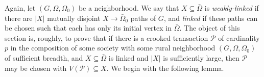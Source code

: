 Again, let $(G, \Omega, \Omega_0)$ be a neighborhood. We say that $X \subseteq \bar{\Omega}$ is \textit{weakly-linked} if there are $|X|$ mutually disjoint $X \to \bar{\Omega}_0$ paths of $G$, and \textit{linked} if these paths can be chosen such that each has only its initial vertex in $\bar{\Omega}$. The object of this section is, roughly, to prove that if there is a crooked transaction $\mathscr{P}$ of cardinality $p$ in the composition of some society with some rural neighborhood $(G, \Omega, \Omega_0)$ of sufficient breadth, and $X \subseteq \bar{\Omega}$ is linked and $|X|$ is sufficiently large, then $\mathscr{P}$ may be chosen with $V(\mathscr{P}) \subseteq X$. We begin with the following lemma.

